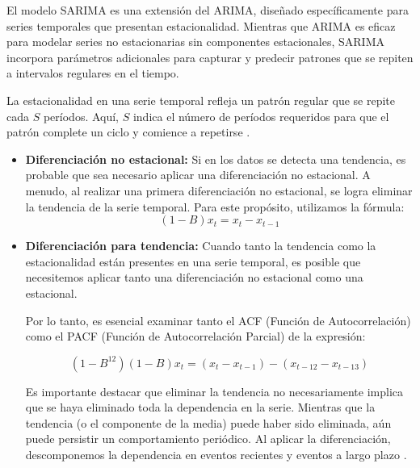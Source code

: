 El modelo SARIMA es una extensión del ARIMA, diseñado específicamente para series temporales que presentan estacionalidad. Mientras que ARIMA es eficaz para modelar series no estacionarias sin componentes estacionales, SARIMA incorpora parámetros adicionales para capturar y predecir patrones que se repiten a intervalos regulares en el tiempo.

La estacionalidad en una serie temporal refleja un patrón regular que se repite cada 
\( S \) períodos. Aquí, \( S \) indica el número de períodos requeridos para que el patrón complete un ciclo y comience a repetirse \cite{series-de-tiempo-sarima}.

\begin{itemize}
\item \textbf{Diferenciación no estacional:} Si en los datos se detecta una tendencia, es probable que sea necesario aplicar una diferenciación no estacional. A menudo, al realizar una primera diferenciación no estacional, se logra eliminar la tendencia de la serie temporal. Para este propósito, utilizamos la fórmula:
    \begin{equation*}
        (1 - B) x_t = x_t - x_{t-1}
    \end{equation*}
\end{itemize}

\begin{itemize}
    \item \textbf{Diferenciación para tendencia:} Cuando tanto la tendencia como la estacionalidad están presentes en una serie temporal, es posible que necesitemos aplicar tanto una diferenciación no estacional como una estacional.

    Por lo tanto, es esencial examinar tanto el ACF (Función de Autocorrelación) como el PACF (Función de Autocorrelación Parcial) de la expresión:
    
        \begin{equation*}
            (1 - B^{12})(1 - B) x_t = (x_t - x_{t-1}) - (x_{t-12} - x_{t-13})
        \end{equation*}
    
        Es importante destacar que eliminar la tendencia no necesariamente implica que se haya eliminado toda la dependencia en la serie. Mientras que la tendencia (o el componente de la media) puede haber sido eliminada, aún puede persistir un comportamiento periódico. Al aplicar la diferenciación, descomponemos la dependencia en eventos recientes y eventos a largo plazo \cite{series-de-tiempo-sarima}.    
\end{itemize}

